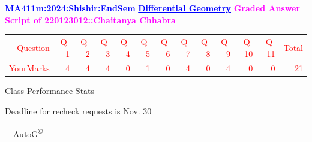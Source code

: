 \documentclass{article}                              %
\begin{document}
%
\vspace*{1in}

\begin{center}
	\textbf{\textcolor{blue}{\LARGE MA411m:2024:Shishir:EndSem}}
	\vskip 1cm
	\textbf{\textcolor{blue}{\underline{\Large Differential Geometry}}}
	\vskip 1cm
	\textbf{\textcolor{magenta}{\LARGE Graded Answer Script of 220123012::Chaitanya Chhabra}}
\end{center}


\begin{center}
	\Huge 
	\textcolor{red}{
	\begin{tabular}{*{13}{r}}
		Question&Q-1& Q-2& Q-3& Q-4& Q-5& Q-6& Q-7& Q-8& Q-9& Q-10& Q-11&Total  \\
        	YourMarks&4&4&4&0&1&0&4&0&4&0&0&21
	\end{tabular}
	}
        \vskip 2cm
	\large
	\underline{Class Performance Stats}
	\DTLsetseparator{;}
	\begin{table}[htbp]
		\centering
	\end{table}
	\vskip 1cm
	Deadline for recheck requests is Nov. 30
\end{center}
\ \vfill \ \hfill \small AutoG\textsuperscript{\copyright}
\newpage
%
\end{document}
